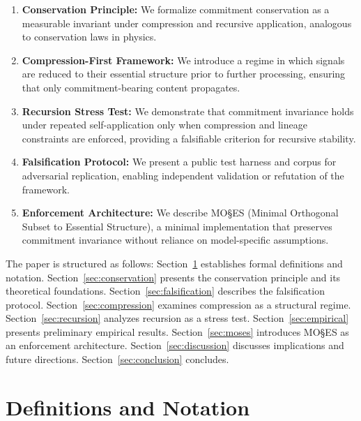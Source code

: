 \documentclass[11pt,a4paper]{article}
\begin{document}
\begin{enumerate}
    \item \textbf{Conservation Principle:} We formalize commitment conservation as a measurable invariant under compression and recursive application, analogous to conservation laws in physics.

    \item \textbf{Compression-First Framework:} We introduce a regime in which signals are reduced to their essential structure prior to further processing, ensuring that only commitment-bearing content propagates.

    \item \textbf{Recursion Stress Test:} We demonstrate that commitment invariance holds under repeated self-application only when compression and lineage constraints are enforced, providing a falsifiable criterion for recursive stability.

    \item \textbf{Falsification Protocol:} We present a public test harness and corpus for adversarial replication, enabling independent validation or refutation of the framework.

    \item \textbf{Enforcement Architecture:} We describe MO\S{}ES\texttrademark{} (Minimal Orthogonal Subset to Essential Structure), a minimal implementation that preserves commitment invariance without reliance on model-specific assumptions.
\end{enumerate}

The paper is structured as follows: Section~\ref{sec:definitions} establishes formal definitions and notation. Section~\ref{sec:conservation} presents the conservation principle and its theoretical foundations. Section~\ref{sec:falsification} describes the falsification protocol. Section~\ref{sec:compression} examines compression as a structural regime. Section~\ref{sec:recursion} analyzes recursion as a stress test. Section~\ref{sec:empirical} presents preliminary empirical results. Section~\ref{sec:moses} introduces MO\S{}ES\texttrademark{} as an enforcement architecture. Section~\ref{sec:discussion} discusses implications and future directions. Section~\ref{sec:conclusion} concludes.

\section{Definitions and Notation}
\label{sec:definitions}
\end{document}
